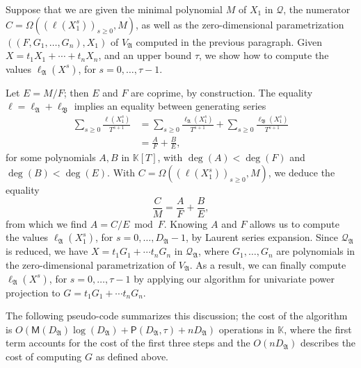 \documentclass[12pt]{article}
\newcommand{\todo}[1]{\textcolor{red}{({\bf todo:} #1)}}
\newcommand{\lf}{X}
\newcommand{\residueI}{\mathscr{Q}}
\def\M {\ensuremath{\mathsf{M}}}
\def\PP {\ensuremath{\mathsf{P}}}
\def\K{\mathbb{K}}
\def\K {\ensuremath{\mathbb{K}}}
\begin{document}

Suppose that we are given the minimal polynomial $M$ of $X_1$ in
$\residueI$, the numerator $C=\Omega( (\ell(X_1^s))_{s \ge 0}, M)$, as
well as the zero-dimensional parametrization $((F,G_1,\dots,G_n),X_1)$
of $V_\mathfrak{A}$ computed in the previous paragraph.  Given
$\lf=t_1 X_1 + \cdots+ t_n X_n$, and an upper bound $\tau$, we show
how to compute the values $\ell_\mathfrak{A}(\lf^s)$, for
$s=0,\dots,\tau-1$.

Let $E=M/F$; then $E$ and $F$ are coprime, by construction.
The equality $\ell= \ell_{\mathfrak{A}} + \ell_{\mathfrak{B}}$ implies
an equality between generating series
\begin{align*}
\sum_{s \ge 0} \frac{\ell(X_1^s)}{T^{s+1}} & = \sum_{s \ge 0}\frac{\ell_\mathfrak{A}(X_1^s)}{T^{s+1}}  
+\sum_{s \ge 0} \frac{\ell_\mathfrak{B}(X_1^s)}{T^{s+1}}\\
& = \frac{A}{F} + \frac{B}{E},
\end{align*}
for some polynomials $A,B$ in $\K[T]$, with $\deg(A) < \deg(F)$ and
$\deg(B) < \deg(E)$. With  $C=\Omega( (\ell(X_1^s))_{s \ge 0}, M)$, we deduce the equality
$$\frac{C}{M}=\frac{A}{F} + \frac{B}{E},$$ from which we find $A = C/E
\bmod F$. Knowing $A$ and $F$ allows us to compute the values
$\ell_\mathfrak{A}(X_1^s)$, for $s=0,\dots,D_\mathfrak{A}-1$, by
Laurent series expansion.  Since $\residueI_\mathfrak{A}$ is reduced,
we have $\lf = t_1 G_1 + \cdots t_n G_n$ in $\residueI_\mathfrak{A}$,
where $G_1,\dots,G_n$ are polynomials in the zero-dimensional
parametrization of $V_\mathfrak{A}$. As a result, we can finally
compute $\ell_\mathfrak{A}(\lf^s)$, for $s=0,\dots,\tau-1$ by
applying our algorithm for univariate power projection to $G=t_1 G_1 + \cdots t_n G_n$.

The following pseudo-code summarizes this discussion; the cost of the
algorithm is $O(\M(D_\mathfrak{A})\log(D_\mathfrak{A}) +
\PP(D_\mathfrak{A},\tau) +nD_\mathfrak{A})$ operations in $\K$, where the
first term accounts for the cost of the first three steps and 
the $O(nD_\mathfrak{A})$ describes the cost of computing $G$ as defined above.
\end{document}

